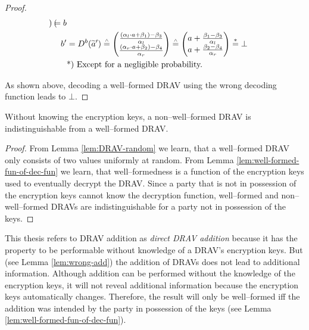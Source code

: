 \begin{proof}
\begin{align*}
\begin{pmatrix}
    \end{pmatrix}
    = b\\
    b' &= D^b(\widetilde{a}')
    \stackrel{\scriptscriptstyle\wedge}{=}
    \begin{pmatrix}
      \frac{(\alpha_l \cdot a + \beta_1) - \beta_3}{\alpha_l}\\
      \frac{(\alpha_r \cdot a + \beta_2) - \beta_4}{\alpha_r}\\
    \end{pmatrix}
    \stackrel{\scriptscriptstyle\wedge}{=}
    \begin{pmatrix}
      a +
      \frac{\beta_1 - \beta_3}{\alpha_l}\\
      a +
      \frac{\beta_2 - \beta_4}{\alpha_r}\\
    \end{pmatrix}
    \stackrel{*}{=} \bot\\
    &\text{*) Except for a negligible probability.}{}
  \end{align*}

  \noindent{}As shown above, decoding a well--formed DRAV using the wrong
  decoding function leads to $\bot$.

\end{proof}


\begin{lem}
  \label{lem:DRAV-indistinguishable}

  Without knowing the encryption keys, a non--well--formed DRAV is
  indistinguishable from a well--formed DRAV\@.

\end{lem}
\begin{proof}

  From Lemma \ref{lem:DRAV-random} we learn, that a well--formed DRAV only
  consists of two values uniformly at random. From Lemma
  \ref{lem:well-formed-fun-of-dec-fun} we learn, that well--formedness is a
  function of the encryption keys used to eventually decrypt the DRAV\@. Since a
  party that is not in possession of the encryption keys cannot know the
  decryption function, well--formed and non--well--formed DRAVs are
  indistinguishable for a party not in possession of the keys.

\end{proof}


\label{sec:DRAV-addition}

This thesis refers to DRAV addition as \emph{direct DRAV addition} because it
has the property to be performable without knowledge of a DRAV's encryption
keys. But (see Lemma \ref{lem:wrong-add}) the addition of DRAVs does not lead to
additional information. Although addition can be performed without the knowledge
of the encryption keys, it will not reveal additional information because the
encryption keys automatically changes. Therefore, the result will only be
well--formed iff the addition was intended by the party in possession of the
keys (see Lemma \ref{lem:well-formed-fun-of-dec-fun}).

